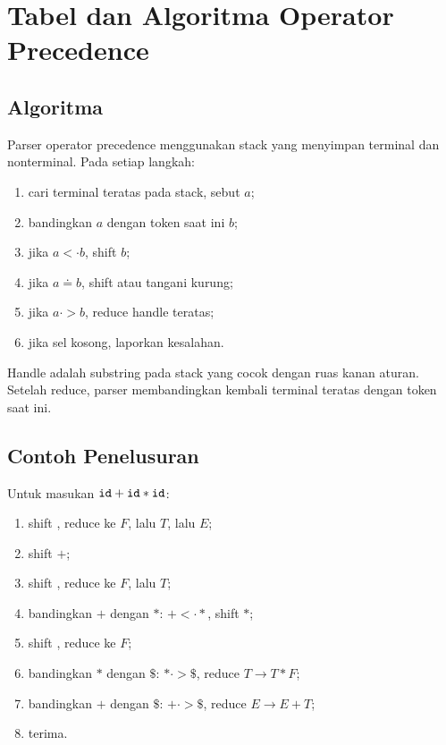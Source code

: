 \section{Tabel dan Algoritma Operator Precedence}
\label{sec:ch11-algoritma}

\subsection{Algoritma}

Parser operator precedence menggunakan stack yang menyimpan terminal
dan nonterminal. Pada setiap langkah:
\begin{enumerate}[label=\arabic*.,leftmargin=*]
  \item cari terminal teratas pada stack, sebut \(a\);
  \item bandingkan \(a\) dengan token saat ini \(b\);
  \item jika \(a <\cdot b\), shift \(b\);
  \item jika \(a \doteq b\), shift atau tangani kurung;
  \item jika \(a \cdot> b\), reduce handle teratas;
  \item jika sel kosong, laporkan kesalahan.
\end{enumerate}

Handle adalah substring pada stack yang cocok dengan ruas kanan
aturan. Setelah reduce, parser membandingkan kembali terminal
teratas dengan token saat ini.

\subsection{Contoh Penelusuran}

Untuk masukan \(\texttt{id} + \texttt{id} * \texttt{id}\):
\begin{enumerate}[label=\arabic*.,leftmargin=*]
  \item shift , reduce ke \(F\), lalu \(T\), lalu \(E\);
  \item shift \(+\);
  \item shift , reduce ke \(F\), lalu \(T\);
  \item bandingkan \(+\) dengan \(*\): \(+ <\cdot *\), shift \(*\);
  \item shift , reduce ke \(F\);
  \item bandingkan \(*\) dengan \(\$\): \(* \cdot> \$\), reduce
        \(T \to T * F\);
  \item bandingkan \(+\) dengan \(\$\): \(+ \cdot> \$\), reduce
        \(E \to E + T\);
  \item terima.
\end{enumerate}

